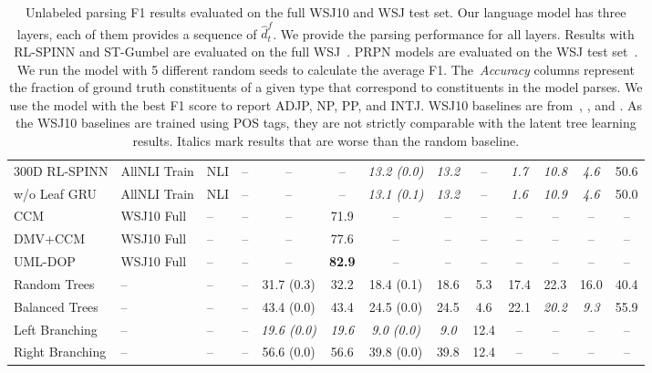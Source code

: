 \documentclass{article} \usepackage{iclr2019_conference,times}
\begin{document}
\begin{table*}[t]
{\begin{tabular}{llllccccccccc}
300D RL-SPINN & AllNLI Train & NLI & -- &  -- & -- & \it 13.2 (0.0) & \it 13.2 & -- & \it 1.7 & \it 10.8 & \it 4.6 & 50.6  \\
\hspace{1em} w/o Leaf GRU & AllNLI Train & NLI & -- & -- & -- & \it 13.1 (0.1) & \it 13.2 & --  & \it 1.6 & \it 10.9 & \it 4.6 & 50.0 \\
\midrule 
CCM   &  WSJ10 Full & -- & -- & -- & 71.9 & -- & -- & -- & -- & -- & -- & -- \\
DMV+CCM  & WSJ10 Full & -- & -- & -- & 77.6 & -- &  -- & -- & -- & -- & -- & -- \\
UML-DOP &   WSJ10 Full & -- & -- & -- & \bf 82.9 & -- & -- & -- & -- & -- & -- & --  \\
\midrule
Random Trees & --  & -- & -- & 31.7 (0.3) & 32.2 & 18.4 (0.1) & 18.6 & 5.3 &17.4 & 22.3 & 16.0 & 40.4 \\
Balanced Trees & -- & -- & -- & 43.4 (0.0) & 43.4 & 24.5 (0.0) & 24.5 & 4.6 & 22.1 & \textit{20.2} & \textit{9.3} & 55.9 \\
Left Branching & --  & -- & -- & \it 19.6 (0.0) & \it 19.6 & \it 9.0 (0.0) & \it 9.0 & 12.4 & -- & -- & -- & --  \\
Right Branching &  -- & -- & -- & 56.6 (0.0) & 56.6 & 39.8 (0.0) & 39.8  &  12.4 & -- & -- & -- & --  \\
\bottomrule 
\end{tabular}
}
\caption{ Unlabeled parsing F1 results evaluated on the full WSJ10 and WSJ test set. 
Our language model has three layers, each of them provides a sequence of $\hat{d}^f_t$. 
We provide the parsing performance for all layers.
Results with RL-SPINN and ST-Gumbel are evaluated on the full WSJ~\citep{williams2017broad}. 
PRPN models are evaluated on the WSJ test set~\citep{htut2018grammar}. We run the model with 5 different random seeds to calculate the average F1. The~\textit{Accuracy} columns represent the fraction of ground truth constituents of a given type that correspond to constituents in the model parses.
We use the model with the best F1 score to report ADJP, NP, PP, and INTJ.
WSJ10 baselines are from~\citet[][CCM]{klein2002generative}, \citet[][DMV+CCM]{klein2005natural}, and \citet[][UML-DOP]{bod2006all}.
As the WSJ10 baselines are trained using POS tags, they are not strictly comparable with the latent tree learning results.
Italics mark results that are worse than the random baseline.
}
\label{tab:wsj-table}
\end{table*} 
\end{document}
